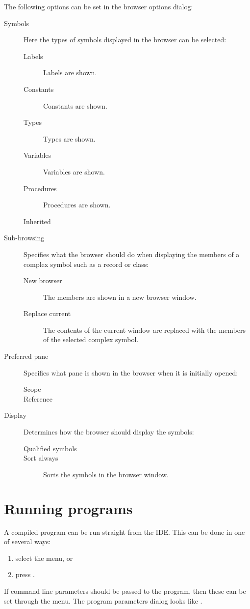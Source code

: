 The following options can be set in the browser options dialog:
\begin{description}
\item[Symbols] Here the types of symbols displayed in the browser can be
selected:
\begin{description}
\item[Labels] Labels are shown.
\item[Constants] Constants are shown.
\item[Types] Types are shown.
\item[Variables] Variables are shown.
\item[Procedures] Procedures are shown.
\item[Inherited]
\end{description}
\item[Sub-browsing] Specifies what the browser should do when displaying the
members of a complex symbol such as a record or class:
\begin{description}
\item[New browser] The members are shown in a new browser window.
\item[Replace current] The contents of the current window are replaced with
the members of the selected complex symbol.
\end{description}
\item[Preferred pane] Specifies what pane is shown in the browser when it is
initially opened:
\begin{description}
\item[Scope]
\item[Reference]
\end{description}
\item[Display] Determines how the browser should display the symbols:
\begin{description}
\item[Qualified symbols]
\item[Sort always] Sorts the symbols in the browser window.
\end{description}
\end{description}

\section{Running programs}
\label{se:running}
A compiled program can be run straight from the IDE. This can be done
in one of several ways:
\begin{enumerate}
\item select the  menu, or
\item press .
\end{enumerate}
If command line parameters should be passed to the program, then these
can be set through the  menu.
The program parameters dialog looks like .

